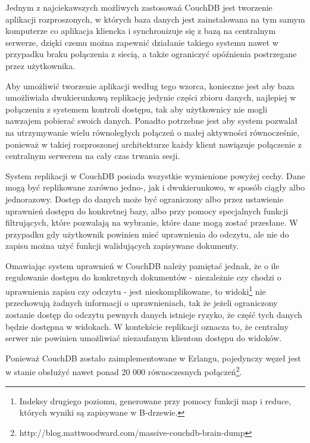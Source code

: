 
Jednym z najciekawszych możliwych zastosowań CouchDB jest tworzenie aplikacji rozproszonych, w których baza danych jest zainstalowana na tym samym komputerze co aplikacja kliencka i synchronizuje się z bazą na centralnym serwerze, dzięki czemu można zapewnić działanie takiego systemu nawet w przypadku braku połączenia z siecią, a także ograniczyć opóźnienia postrzegane przez użytkownika.

Aby umożliwić tworzenie aplikacji według tego wzorca, konieczne jest aby baza umożliwiała dwukierunkową replikację jedynie części zbioru danych, najlepiej w połączeniu z systemem kontroli dostępu, tak aby użytkownicy nie mogli nawzajem pobierać swoich danych.
Ponadto potrzebne jest aby system pozwalał na utrzymywanie wielu równoległych połączeń o małej aktywności równocześnie, ponieważ w takiej rozproszonej architekturze każdy klient nawiązuje połączenie z centralnym serwerem na cały czas trwania sesji.

System replikacji w CouchDB posiada wszystkie wymienione powyżej cechy.
Dane mogą być replikowane zarówno jedno-, jak i dwukierunkowo, w sposób ciągły albo jednorazowy.
Dostęp do danych może być ograniczony albo przez ustawienie uprawnień dostępu do konkretnej bazy, albo przy pomocy specjalnych funkcji filtrujących, które pozwalają na wybranie, które dane mogą zostać przesłane.
W przypadku gdy użytkownik powinien mieć uprawnienia do odczytu, ale nie do zapisu można użyć funkcji walidujących zapisywane dokumenty.

Omawiając system uprawnień w CouchDB należy pamiętać jednak, że o ile regulowanie dostępu do konkretnych dokumentów - niezależnie czy chodzi o uprawnienia zapisu czy odczytu - jest nieskomplikowane, to widoki\footnote{Indeksy drugiego poziomu, generowane przy pomocy funkcji map i reduce, których wyniki są zapisywane w B-drzewie.} nie przechowują żadnych informacji o uprawnieniach, tak że jeżeli ograniczony zostanie dostęp do odczytu pewnych danych istnieje ryzyko, że część tych danych będzie dostępna w widokach.
W kontekście replikacji oznacza to, że centralny serwer nie powinien umożliwiać niezaufanym klientom dostępu do widoków.

Ponieważ CouchDB zostało zaimplementowane w Erlangu, pojedynczy węzeł jest w stanie obsłużyć nawet ponad 20 000 równoczesnych połączeń\footnote{http://blog.mattwoodward.com/massive-couchdb-brain-dump}.

